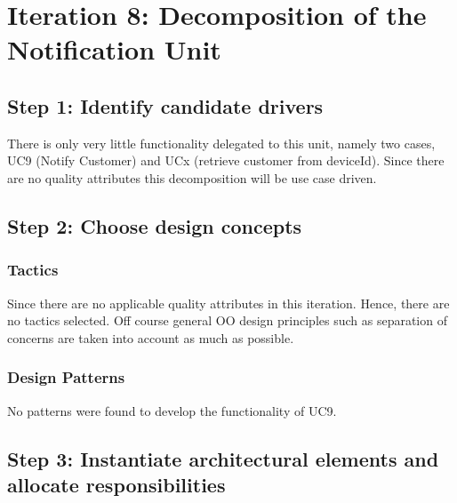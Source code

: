 \section{Iteration 8: Decomposition of the Notification Unit}
\label{add:it8}

\subsection{Step 1: Identify candidate drivers}
\label{add:it8/drivers}

\npar There is only very little functionality delegated to this unit, namely two
cases, UC9 (Notify Customer) and UCx (retrieve customer from deviceId).
Since there are no quality attributes this decomposition will be use case
driven.

\subsection{Step 2: Choose design concepts}
\label{add:it8/concepts}

\subsubsection{Tactics}
\label{add:it8/tactics}

\npar Since there are no applicable quality attributes in this iteration.
Hence, there are no tactics selected. Off course general OO design principles
such as separation of concerns are taken into account as much as possible.

\subsubsection{Design Patterns}
\label{add:it8/patterns}

\npar No patterns were found to develop the functionality of UC9.

\subsection{Step 3: Instantiate architectural elements and allocate responsibilities}
\label{add:it8/elements}

